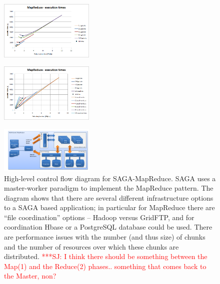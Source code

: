\documentclass[conference,final]{IEEEtran}
\newcommand{\jhanote}[1]{ {\textcolor{red} { ***SJ: #1 }}}
\newcommand{\jhanote}[1]{}
\begin{document}
\begin{figure}[t]  \includegraphics[width=0.4\textwidth]{MapReduce_local_executiontimeperworkerdatasize.png}\label{}
\end{figure}


\begin{figure}[t]
\includegraphics[width=0.4\textwidth]{MapReduce_local_executiontimeworkersdatasize2.png}
\label{}
\end{figure}


\begin{figure}[t]
      \centering
          \includegraphics[width=0.4\textwidth]{saga-mapreduce_controlflow.png}
          \caption{High-level control flow diagram for
            SAGA-MapReduce. SAGA uses a master-worker paradigm to
            implement the MapReduce pattern. The diagram shows that
            there are several different infrastructure options to a
            SAGA based application; in particular for MapReduce there
            are ``file coordination'' options -- Hadoop versus
            GridFTP, and for coordination Hbase or a PostgreSQL
            database could be used. There are performance issues with
            the number (and thus size) of chunks and the number of
            resources over which these chunks are distributed.
            \jhanote{I think there should be something between the
              Map(1) and the Reduce(2) phases.. something that comes
              back to the Master, non?}}
      \label{saga-mapreduce_controlflow.png}
\end{figure}
\end{document}

